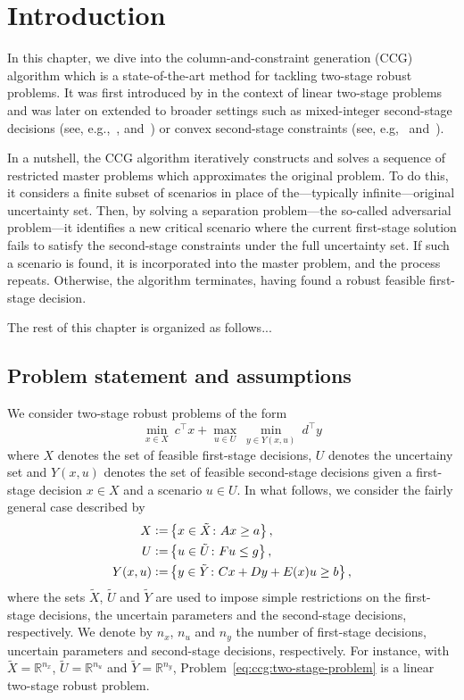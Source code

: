 \section{Introduction}

In this chapter, we dive into the column-and-constraint generation (CCG)
algorithm which is a state-of-the-art method for tackling two-stage robust
problems. It was first introduced by \textcite{Zeng2013} in the context of
linear two-stage problems and was later on extended to broader settings such
as mixed-integer second-stage decisions (see, e.g.,~\cite{zeng2012exact},
\cite{Subramanyam2022} and~\cite{lefebvre2025correctiontolagrangiandual}) or
convex second-stage constraints (see, e.g,~\cite{khademi2022dual}
and~\cite{lefebvre2022convex}).

In a nutshell, the CCG algorithm iteratively constructs and solves a sequence
of restricted master problems which approximates the original problem. To do
this, it considers a finite subset of scenarios in place of the---typically
infinite---original uncertainty set. Then, by solving a separation
problem---the so-called adversarial problem---it identifies a new critical
scenario where the current first-stage solution fails to satisfy the
second-stage constraints under the full uncertainty set. If such a scenario is
found, it is incorporated into the master problem, and the process repeats.
Otherwise, the algorithm terminates, having found a robust feasible
first-stage decision.

The rest of this chapter is organized as follows...

\subsection{Problem statement and assumptions}
We consider two-stage robust problems of the form
\begin{equation}
    \label{eq:ccg:two-stage-problem}
    \min_{x\in X} \ c^\top x + \max_{ u\in U } \ \min_{y\in Y(x,u)} \ d^\top y
\end{equation}
where $X$ denotes the set of feasible first-stage decisions, $U$ denotes the
uncertainy set and $Y(x,u)$ denotes the set of feasible second-stage decisions
given a first-stage decision $x\in X$ and a scenario $u\in U$. In what
follows, we consider the fairly general case described by 
\begin{align*}
    X \mathrel{{\mathop:}{=}} & \left\{ x\in \tilde{X} \colon Ax \ge a \right\}, \\
    U \mathrel{{\mathop:}{=}} & \left\{ u\in\tilde{U} \colon Fu \le g \right\}, \\
    Y(x,u) \mathrel{{\mathop:}{=}} & \left\{ y\in \tilde{Y} \colon Cx + Dy + E(x)u \ge b \right\},
\end{align*}
where the sets $\tilde{X}$, $\tilde{U}$ and $\tilde{Y}$ are used to impose
simple restrictions on the first-stage decisions, the uncertain parameters and
the second-stage decisions, respectively. We denote by $n_x$, $n_u$ and $n_y$
the number of first-stage decisions, uncertain parameters and second-stage
decisions, respectively. For instance, with $\tilde{X} = \mathbb{R}^{n_x}$,
$\tilde{U} = \mathbb{R}^{n_u}$ and $\tilde{Y} = \mathbb{R}^{n_y}$,
Problem~\eqref{eq:ccg:two-stage-problem} is a linear two-stage robust problem.

